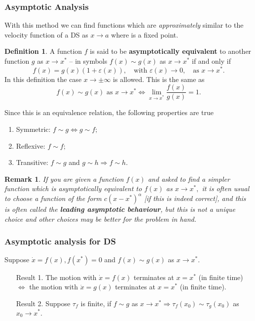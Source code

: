 \documentclass[12pt, a4paper]{article}
\newcommand{\imply}{\Rightarrow}
\newtheorem*{remark}{Remark}
\theoremstyle{definition}
\newtheorem{definition}{Definition}[section]
\theoremstyle{plain}
\begin{document}
\subsubsection{Asymptotic Analysis}

With this method we can find functions which are \textit{approximately} similar to the velocity function of a DS as $x\to a$ where is a fixed point.

\begin{definition}
A function $f$ is said to be \textbf{asymptotically equivalent} to another function $g$ as $x \to x^*$ -- in symbols $f(x)\sim g(x)$ as $x \to x^*$ if and only if $$f(x)=g(x)(1+\varepsilon(x)), \quad \text{with } \varepsilon(x)\to0, \quad \text{as } x\to x^*.$$ In this definition the case $x\to\pm\infty$ is allowed. This is the same as $$f(x) \sim g(x) \text{ as } x\to x^* \iff \lim_{x\to x^*} \frac{f(x)}{g(x)}=1.$$
\end{definition}

Since this is an equivalence relation, the following properties are true \begin{enumerate}
	
	\item Symmetric: $f \sim g \iff g \sim f;$
	\item Reflexive: $f\sim f;$
	\item Transitive: $f\sim g$ and $g\sim h \imply f\sim h.$

\end{enumerate}

\begin{remark}
If you are given a function $f(x)$ and asked to find a simpler function which is asymptotically equivalent to $f(x)$ as $x \to x^*,$ it is often usual to choose a function of the form $c(x-x^*)^{\alpha}$ [if this is indeed correct], and this is often called the \textbf{leading asymptotic behaviour}, but this is not a unique choice and other choices may be better for the problem in hand.
\end{remark}

\subsubsection{Asymptotic analysis for DS}

Suppose $\dot{x}=f(x), f(x^*)=0$ and $f(x)\sim g(x)$ as $x\to x^*.$ \begin{enumerate}
	
	\item[Result 1.] The motion with $\dot{x}=f(x)$ terminates at $x=x^*$ (in finite time) $\iff$ the motion with $\dot{x}=g(x)$ terminates at $x=x^*$ (in finite time).

	\item[Result 2.] Suppose $\tau_f$ is finite, if $f \sim g$ as $x\to x^* \imply \tau_f(x_0)\sim \tau_g(x_0)$ as $x_0\to x^*.$ 

\end{enumerate}
\end{document}
